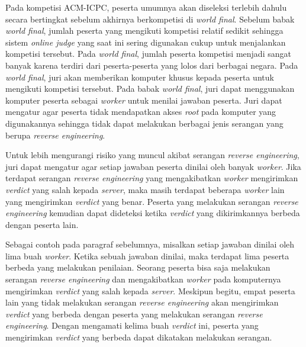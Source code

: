 \par Pada kompetisi ACM-ICPC, peserta umumnya akan diseleksi terlebih dahulu secara bertingkat sebelum akhirnya berkompetisi di \textit{world final}. Sebelum babak \textit{world final}, jumlah peserta yang mengikuti kompetisi relatif sedikit sehingga sistem \textit{online judge} yang saat ini sering digunakan cukup untuk menjalankan kompetisi tersebut. Pada \textit{world final}, jumlah peserta kompetisi menjadi sangat banyak karena terdiri dari peserta-peserta yang lolos dari berbagai negara. Pada \textit{world final}, juri akan memberikan komputer khusus kepada peserta untuk mengikuti kompetisi tersebut. Pada babak \textit{world final}, juri dapat menggunakan komputer peserta sebagai \textit{worker} untuk menilai jawaban peserta. Juri dapat mengatur agar peserta tidak mendapatkan akses \textit{root} pada komputer yang digunakannya sehingga tidak dapat melakukan berbagai jenis serangan yang berupa \textit{reverse engineering}.

\par Untuk lebih mengurangi risiko yang muncul akibat serangan \textit{reverse engineering}, juri dapat mengatur agar setiap jawaban peserta dinilai oleh banyak \textit{worker}. Jika terdapat serangan \textit{reverse engineering} yang mengakibatkan \textit{worker} mengirimkan \textit{verdict} yang salah kepada \textit{server}, maka masih terdapat beberapa \textit{worker} lain yang mengirimkan \textit{verdict} yang benar. Peserta yang melakukan serangan \textit{reverse engineering} kemudian dapat dideteksi ketika \textit{verdict} yang dikirimkannya berbeda dengan peserta lain.

\par Sebagai contoh pada paragraf sebelumnya, misalkan setiap jawaban dinilai oleh lima buah \textit{worker}. Ketika sebuah jawaban dinilai, maka terdapat lima peserta berbeda yang melakukan penilaian. Seorang peserta bisa saja melakukan serangan \textit{reverse engineering} dan mengakibatkan \textit{worker} pada komputernya mengirimkan \textit{verdict} yang salah kepada \textit{server}. Meskipun begitu, empat peserta lain yang tidak melakukan serangan \textit{reverse engineering} akan mengirimkan \textit{verdict} yang berbeda dengan peserta yang melakukan serangan \textit{reverse engineering}. Dengan mengamati kelima buah \textit{verdict} ini, peserta yang mengirimkan \textit{verdict} yang berbeda dapat dikatakan melakukan serangan.



